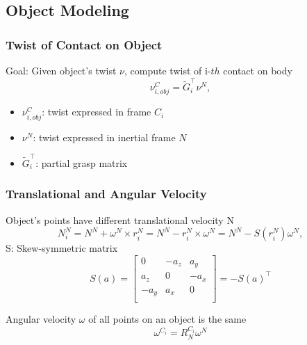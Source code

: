 \documentclass{beamer}
\begin{document}
\subsection{Object Modeling}

\begin{frame}
\frametitle{Twist of Contact on Object}
Goal: Given object's twist $\nu$, compute twist of i-$th$ contact on body 
\begin{equation*}
\nu_{i,obj}^C=\tilde{G}^{\intercal}_i \nu^N,
\end{equation*}
\begin{itemize}
\item $\nu_{i,obj}^C$: twist expressed in frame {$C_i$} \vspace{.2cm}
\item $\nu^N$: twist expressed in inertial frame {$N$} \vspace{.2cm}
\item $\tilde{G}^{\intercal}_i$: partial grasp matrix \vspace{.2cm}
\end{itemize}
\end{frame}


\begin{frame}
\frametitle{Translational and Angular Velocity }
Object's points have different translational velocity N 
\begin{equation*}
N_{i}^{N}=N^N + \omega^N\times r_{i}^{N} = N^N - r_i^N\times \omega^N= N^N - S(r_i^N) \omega^N,
\end{equation*}
S: Skew-symmetric matrix 
\begin{equation*}
S(a)=\begin{bmatrix}
0 & -a_z & a_y \\
a_z & 0 & -a_x \\
-a_y& a_x & 0 \\
\end{bmatrix}=-S(a)^{\intercal}
\end{equation*}

Angular velocity $\omega$ of all points on an object is the same
\begin{equation*}
\omega^{C_i} = R_{N}^{C_i}\omega^{N}
\end{equation*}

\end{frame}

\end{document}
